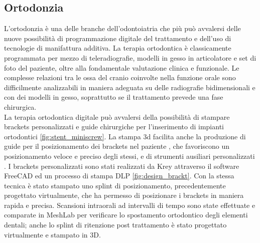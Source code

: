\subsection{Ortodonzia} 
L'ortodonzia è una delle branche dell'odontoiatria che più può avvalersi delle nuove possibilità di programmazione digitale del trattamento e dell'uso di tecnologie di manifattura additiva. La terapia ortodontica è classicamente programmata per mezzo di teleradiografie, modelli in gesso in articolatore e set di foto del paziente, oltre alla fondamentale valutazione clinica e funzionale. Le complesse relazioni tra le ossa del cranio coinvolte nella funzione orale sono difficilmente analizzabili in maniera adeguata su delle radiografie bidimensionali e con dei modelli in gesso, soprattutto se il trattamento prevede una fase chirurgica.\\
La terapia ortodontica digitale può avvalersi della possibilità di stampare brackets personalizzati \parencite{Reference115} e guide chirurgiche per l'inserimento di impianti ortodontici \parencite{Reference116} \ref{fig:stent_miniscrew}. La stampa 3d facilita anche la produzione di guide per il posizionamento dei brackets nel paziente \parencite{Reference127}, che favoriscono un posizionamento veloce e preciso degli stessi, e di strumenti ausiliari personalizzati \parencite{Reference126}. I brackets personalizzati sono stati realizzati da Krey attraverso il software FreeCAD ed un processo di stampa DLP \ref{fig:design_brackt}. Con la stessa tecnica è stato stampato uno splint di posizionamento, precedentemente progettato virtualmente, che ha permesso di posizionare i brackets in maniera rapida e precisa. Scansioni intraorali ad intervalli di tempo sono state effettuate e comparate in MeshLab per verificare lo spostamento ortodontico degli elementi dentali; anche lo splint di ritenzione post trattamento è stato progettato virtualmente e stampato in 3D.\\
